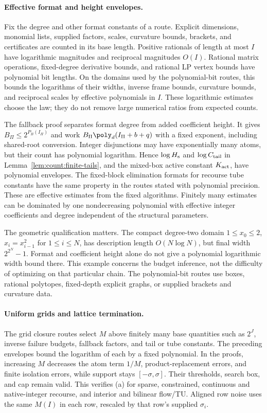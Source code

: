 \paragraph{Effective format and height envelopes.}
Fix the degree and other format constants of a route. Explicit dimensions,
monomial lists, supplied factors, scales, curvature bounds, brackets, and
certificates are counted in its base length. Positive rationals of length
at most $I$ have logarithmic magnitudes and reciprocal magnitudes $O(I)$.
Rational matrix operations, fixed-degree derivative bounds, and rational
LP vertex bounds have polynomial bit lengths. On the domains used by the
polynomial-bit routes, this bounds the logarithms of their widths, inverse
frame bounds, curvature bounds, and reciprocal scales by effective
polynomials in $I$. These logarithmic estimates choose the law; they do
not remove large numerical ratios from expected counts.

The fallback proof separates format degree from added coefficient height.
It gives $B_\Pi\le2^{P_B(I_\Pi)}$ and work
$B_\Pi\poly_d(I_\Pi+b+q)$ with a fixed exponent, including shared-root
conversion. Integer disjunctions may have exponentially many atoms, but
their count has polynomial logarithm. Hence $\log H_{\rm s}$ and
$\log C_{\rm tail}$ in Lemma~\ref{lem:count:finite-tails}, and the
mixed-box active constant $K_{\rm act}$, have polynomial envelopes.
The fixed-block elimination formats for recourse tube constants have the
same property in the routes stated with polynomial precision. These are
effective estimates from the fixed algorithms. Finitely many estimates
can be dominated by one nondecreasing polynomial with effective integer
coefficients and degree independent of the structural parameters.

The geometric qualification matters. The compact degree-two domain
$1\le x_0\le2$, $x_i=x_{i-1}^2$ for $1\le i\le N$, has description
length $O(N\log N)$, but final width $2^{2^N}-1$. Format and coefficient
height alone do not give a polynomial logarithmic width bound there.
This example concerns the budget inference, not the difficulty of
optimizing on that particular chain. The polynomial-bit routes use boxes,
rational polytopes, fixed-depth explicit graphs, or supplied brackets
and curvature data.

\paragraph{Uniform grids and lattice termination.}
The grid closure routes select $M$ above finitely many base quantities
such as $2^J$, inverse failure budgets, fallback factors, and tail or
tube constants. The preceding envelopes bound the logarithm of each by
a fixed polynomial. In the proofs, increasing $M$ decreases the atom
term $1/M$, product-replacement errors, and finite isolation errors,
while support stays $[-\sigma,\sigma]$. Their thresholds, search box,
and cap remain valid. This verifies (a) for sparse, constrained,
continuous and native-integer recourse, and interior and bilinear
flow/TU. Aligned row noise uses the same $M(I)$ in each row, rescaled
by that row's supplied $\sigma_i$.

